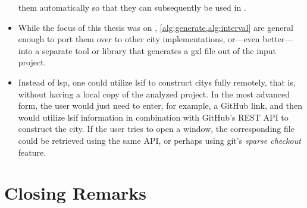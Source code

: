 \documentclass[../thesis]{subfiles}
\begin{document}
\begin{itemize}
{	      } them automatically so that they can subsequently be used in \SEE{}.
	\item While the focus of this thesis was on \SEE{}, \cref{alg:generate,alg:interval} are general enough to port them over to other \gls{city} implementations, or---even better---into a separate tool or library that generates a \gls{gxl} file out of the input project.
	\item Instead of \gls{lsp}, one could utilize \gls{lsif} to construct \glspl{city} fully remotely, that is, without having a local copy of the analyzed project.
	      In the most advanced form, the user would just need to enter, for example, a GitHub link, and then \SEE{} would utilize \gls{lsif} information in combination with GitHub's REST API to construct the city.
	      If the user tries to open a \gls{window}, the corresponding file could be retrieved using the same API, or perhaps using git's \emph{sparse checkout} feature.
\end{itemize}

\section{Closing Remarks}
\fxfatal{}

\end{document}
